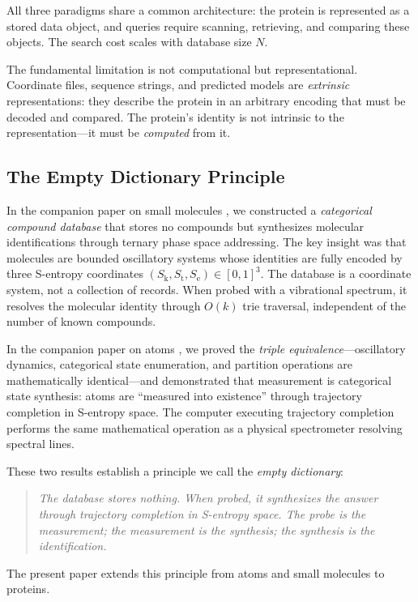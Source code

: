 \documentclass[11pt,twocolumn,a4paper]{article}
\theoremstyle{definition}
\theoremstyle{remark}
\newcommand{\Sk}{S_{\mathrm{k}}}
\newcommand{\St}{S_{\mathrm{t}}}
\newcommand{\Se}{S_{\mathrm{e}}}
\begin{document}
All three paradigms share a common architecture: the protein is represented as a stored data object, and queries require scanning, retrieving, and comparing these objects. The search cost scales with database size $N$.

The fundamental limitation is not computational but representational. Coordinate files, sequence strings, and predicted models are \emph{extrinsic} representations: they describe the protein in an arbitrary encoding that must be decoded and compared. The protein's identity is not intrinsic to the representation---it must be \emph{computed} from it.

\subsection{The Empty Dictionary Principle}

In the companion paper on small molecules \citep{sachikonye2025a}, we constructed a \emph{categorical compound database} that stores no compounds but synthesizes molecular identifications through ternary phase space addressing. The key insight was that molecules are bounded oscillatory systems whose identities are fully encoded by three S-entropy coordinates $(\Sk, \St, \Se) \in [0,1]^3$. The database is a coordinate system, not a collection of records. When probed with a vibrational spectrum, it resolves the molecular identity through $O(k)$ trie traversal, independent of the number of known compounds.

In the companion paper on atoms \citep{sachikonye2025b}, we proved the \emph{triple equivalence}---oscillatory dynamics, categorical state enumeration, and partition operations are mathematically identical---and demonstrated that measurement is categorical state synthesis: atoms are ``measured into existence'' through trajectory completion in S-entropy space. The computer executing trajectory completion performs the same mathematical operation as a physical spectrometer resolving spectral lines.

These two results establish a principle we call the \emph{empty dictionary}:

\begin{quote}
\emph{The database stores nothing. When probed, it synthesizes the answer through trajectory completion in S-entropy space. The probe is the measurement; the measurement is the synthesis; the synthesis is the identification.}
\end{quote}

The present paper extends this principle from atoms and small molecules to proteins.
\end{document}

